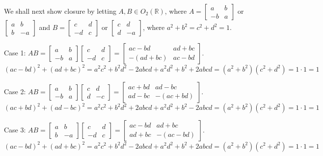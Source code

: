 \documentclass[12pt,letterpaper,reqno]{amsart}
\newcommand{\R}{\mathbb R}
\begin{document}
\begin{enumerate}
\begin{flushleft}
We shall next show closure by letting $A, B \in O_2(\R)$, where $A = \begin{bmatrix} a & b \\-b & a \end{bmatrix}$ or $\begin{bmatrix} a & b \\b & -a \end{bmatrix}$ and $B = \begin{bmatrix} c & d \\-d & c \end{bmatrix}$ or $\begin{bmatrix} c & d \\d & -a \end{bmatrix}$, where $a^2 + b^2 = c^2 + d^2 = 1$.\newline

Case 1: $AB = \begin{bmatrix} a & b \\-b & a \end{bmatrix} \begin{bmatrix} c & d \\-d & c \end{bmatrix} = \begin{bmatrix} ac-bd & ad+bc \\-(ad+bc) & ac-bd \end{bmatrix}$. $(ac-bd)^2 + (ad + bc)^2 = a^2c^2 + b^2d^2 - 2abcd + a^2d^2 + b^2 + 2abcd = (a^2 + b^2)(c^2 + d^2) = 1 \cdot 1 = 1$\newline

Case 2: $AB = \begin{bmatrix} a & b \\-b & a \end{bmatrix} \begin{bmatrix} c & d \\d & -c \end{bmatrix} = \begin{bmatrix} ac+bd & ad-bc \\ad-bc & -(ac+bd) \end{bmatrix}$. $(ac + bd)^2 + (ad - bc)^2 = a^2c^2 + b^2d^2 + 2abcd + a^2d^2 + b^2 - 2abcd = (a^2 + b^2)(c^2 + d^2) = 1 \cdot 1 = 1$\newline

Case 3: $AB = \begin{bmatrix} a & b \\b & -a \end{bmatrix} \begin{bmatrix} c & d \\-d & c \end{bmatrix} = \begin{bmatrix} ac-bd & ad+bc \\ad+bc & -(ac-bd) \end{bmatrix}$. $(ac-bd)^2 + (ad + bc)^2 = a^2c^2 + b^2d^2 - 2abcd + a^2d^2 + b^2 + 2abcd = (a^2 + b^2)(c^2 + d^2) = 1 \cdot 1 = 1$\newline


\end{flushleft}
\end{enumerate}
\end{document}
